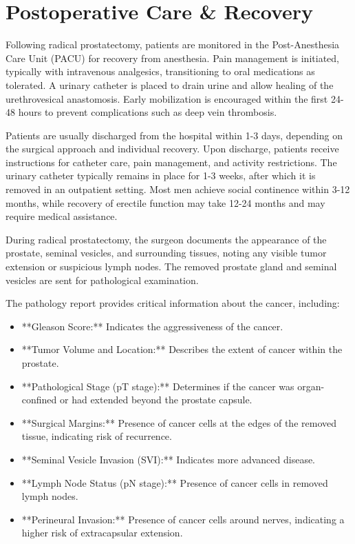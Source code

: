 \section*{Postoperative Care \& Recovery}
Following radical prostatectomy, patients are monitored in the Post-Anesthesia Care Unit (PACU) for recovery from anesthesia. Pain management is initiated, typically with intravenous analgesics, transitioning to oral medications as tolerated. A urinary catheter is placed to drain urine and allow healing of the urethrovesical anastomosis. Early mobilization is encouraged within the first 24-48 hours to prevent complications such as deep vein thrombosis.

Patients are usually discharged from the hospital within 1-3 days, depending on the surgical approach and individual recovery. Upon discharge, patients receive instructions for catheter care, pain management, and activity restrictions. The urinary catheter typically remains in place for 1-3 weeks, after which it is removed in an outpatient setting. Most men achieve social continence within 3-12 months, while recovery of erectile function may take 12-24 months and may require medical assistance.

During radical prostatectomy, the surgeon documents the appearance of the prostate, seminal vesicles, and surrounding tissues, noting any visible tumor extension or suspicious lymph nodes. The removed prostate gland and seminal vesicles are sent for pathological examination.

The pathology report provides critical information about the cancer, including:

\begin{itemize}
  \item **Gleason Score:** Indicates the aggressiveness of the cancer.
  \item **Tumor Volume and Location:** Describes the extent of cancer within the prostate.
  \item **Pathological Stage (pT stage):** Determines if the cancer was organ-confined or had extended beyond the prostate capsule.
  \item **Surgical Margins:** Presence of cancer cells at the edges of the removed tissue, indicating risk of recurrence.
  \item **Seminal Vesicle Invasion (SVI):** Indicates more advanced disease.
  \item **Lymph Node Status (pN stage):** Presence of cancer cells in removed lymph nodes.
  \item **Perineural Invasion:** Presence of cancer cells around nerves, indicating a higher risk of extracapsular extension.
\end{itemize}

